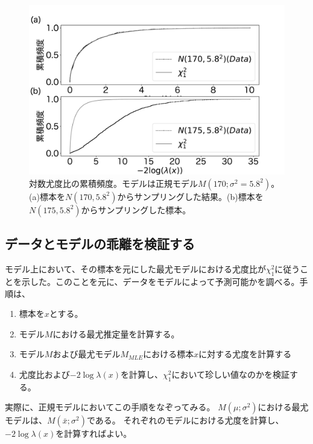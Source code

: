 \begin{figure}
    \begin{center}
        \includegraphics[width=15cm]{./image/04_/loglikeli_norm_test.pdf}
        \caption{対数尤度比の累積頻度。モデルは正規モデル$M(170;\sigma^2=5.8^2)$。(a)標本を$N(170,5.8^2)$からサンプリングした結果。(b)標本を$N(175,5.8^2)$からサンプリングした標本。}
        \label{fig:loglikelihood_test_simulation_norm}

      \end{center}
    \end{figure}

\subsection{データとモデルの乖離を検証する}
モデル上において、その標本を元にした最尤モデルにおける尤度比が$\chi^2_1$に従うことを示した。このことを元に、データをモデルによって予測可能かを調べる。手順は、
\begin{enumerate}
    \item 標本を$x$とする。
    \item モデル$M$における最尤推定量を計算する。
    \item モデル$M$および最尤モデル$M_{MLE}$における標本$x$に対する尤度を計算する
    \item 尤度比および$-2\log\lambda(x)$を計算し、$\chi^2_1$において珍しい値なのかを検証する。
\end{enumerate}
実際に、正規モデルにおいてこの手順をなぞってみる。
$M(\mu;\sigma^2)$における最尤モデルは、$M(\bar{x};\sigma^2)$である。
それぞれのモデルにおける尤度を計算し、$-2\log\lambda(x)$を計算すればよい。

